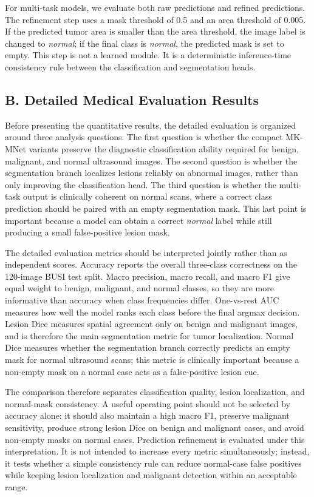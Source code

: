 For multi-task models, we evaluate both raw predictions and refined predictions. The refinement step uses a mask threshold of 0.5 and an area threshold of 0.005. If the predicted tumor area is smaller than the area threshold, the image label is changed to \textit{normal}; if the final class is \textit{normal}, the predicted mask is set to empty. This step is not a learned module. It is a deterministic inference-time consistency rule between the classification and segmentation heads.

\subsection*{B. Detailed Medical Evaluation Results}

Before presenting the quantitative results, the detailed evaluation is organized around three analysis questions. The first question is whether the compact MK-MNet variants preserve the diagnostic classification ability required for benign, malignant, and normal ultrasound images. The second question is whether the segmentation branch localizes lesions reliably on abnormal images, rather than only improving the classification head. The third question is whether the multi-task output is clinically coherent on normal scans, where a correct class prediction should be paired with an empty segmentation mask. This last point is important because a model can obtain a correct \textit{normal} label while still producing a small false-positive lesion mask.

The detailed evaluation metrics should be interpreted jointly rather than as independent scores. Accuracy reports the overall three-class correctness on the 120-image BUSI test split. Macro precision, macro recall, and macro F1 give equal weight to benign, malignant, and normal classes, so they are more informative than accuracy when class frequencies differ. One-vs-rest AUC measures how well the model ranks each class before the final argmax decision. Lesion Dice measures spatial agreement only on benign and malignant images, and is therefore the main segmentation metric for tumor localization. Normal Dice measures whether the segmentation branch correctly predicts an empty mask for normal ultrasound scans; this metric is clinically important because a non-empty mask on a normal case acts as a false-positive lesion cue.

The comparison therefore separates classification quality, lesion localization, and normal-mask consistency. A useful operating point should not be selected by accuracy alone: it should also maintain a high macro F1, preserve malignant sensitivity, produce strong lesion Dice on benign and malignant cases, and avoid non-empty masks on normal cases. Prediction refinement is evaluated under this interpretation. It is not intended to increase every metric simultaneously; instead, it tests whether a simple consistency rule can reduce normal-case false positives while keeping lesion localization and malignant detection within an acceptable range.

